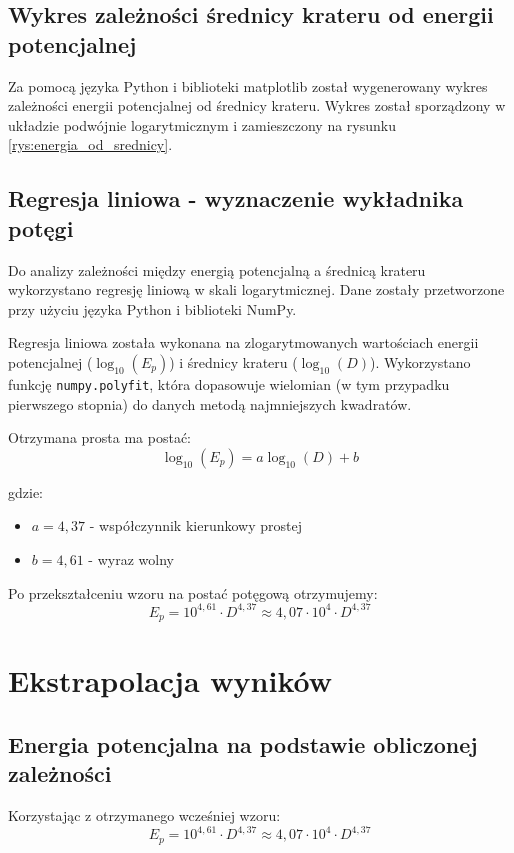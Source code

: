 \documentclass[a4paper,12pt]{article}
\begin{document}
\subsection{Wykres zależności średnicy krateru od energii potencjalnej}

Za pomocą języka Python i biblioteki matplotlib został wygenerowany wykres zależności energii potencjalnej od średnicy krateru. Wykres został sporządzony w układzie podwójnie logarytmicznym i zamieszczony na rysunku \ref{rys:energia_od_srednicy}.

\subsection{Regresja liniowa - wyznaczenie wykładnika potęgi}

Do analizy zależności między energią potencjalną a średnicą krateru wykorzystano regresję liniową w skali logarytmicznej. Dane zostały przetworzone przy użyciu języka Python i biblioteki NumPy.

Regresja liniowa została wykonana na zlogarytmowanych wartościach energii potencjalnej ($\log_{10}(E_p)$) i średnicy krateru ($\log_{10}(D)$). Wykorzystano funkcję \texttt{numpy.polyfit}, która dopasowuje wielomian (w tym przypadku pierwszego stopnia) do danych metodą najmniejszych kwadratów.


Otrzymana prosta ma postać:
\[ \log_{10}(E_p) = a\log_{10}(D) + b \]

gdzie:
\begin{itemize}
    \item $a = 4,37$ - współczynnik kierunkowy prostej
    \item $b = 4,61$ - wyraz wolny
\end{itemize}

Po przekształceniu wzoru na postać potęgową otrzymujemy:
\[ E_p = 10^{4,61} \cdot D^{4,37} \approx 4,07 \cdot 10^4 \cdot D^{4,37} \]
\section{Ekstrapolacja wyników}

\subsection{Energia potencjalna na podstawie obliczonej zależności}

Korzystając z otrzymanego wcześniej wzoru:
\[
E_p = 10^{4,61} \cdot D^{4,37} \approx 4,07 \cdot 10^4 \cdot D^{4,37}
\]
\end{document}
